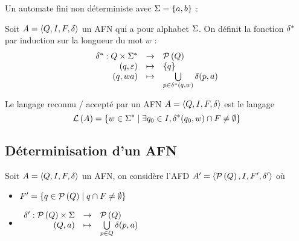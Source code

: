 \begin{exemple}
	Un automate fini non déterministe avec $\Sigma = \left\{a, b\right\}$ :
	\begin{center}
	\end{center}
\end{exemple}


\begin{definition}
	Soit $A = \langle Q, I, F, \delta \rangle$ un AFN qui a pour alphabet $\Sigma$. On définit la fonction $\delta^{*}$ par induction sur la longueur du mot $w$ :
	$$ \begin{array}{rcl}
			\delta^{*} : Q \times \Sigma^{*} & \to     & \mathcal{P}\left(Q\right)                                                  \\
			(q, \varepsilon)                   & \mapsto & \left\{q\right\}                                                    \\
			(q, wa)                         & \mapsto & \bigcup\limits_{p \in \delta^{*} (q, w)} \delta(p, a)
		\end{array} $$
\end{definition}


\begin{definition}
	Le langage reconnu / accepté par un AFN $A = \langle Q, I, F, \delta \rangle$ est le langage
	$$ \mathcal{L}\left(A\right) = \left\{w \in \Sigma^{*} \mid \exists q_0 \in I, \delta^{*}(q_0, w) \cap F \neq \emptyset\right\} $$

\end{definition}

\subsection{Déterminisation d'un AFN}

Soit $A = \langle Q, I, F, \delta \rangle$ un AFN, on considère l'AFD $A' = \langle \mathcal{P}\left(Q\right), I, F', \delta' \rangle$ où
\begin{itemize}
	\item $F' = \left\{q \in \mathcal{P}\left(Q\right) \mid q \cap F \neq \emptyset\right\}$
	      \vspace{0.25cm}
	\item $ \begin{array}{rcl}
			      \delta' : \mathcal{P}\left(Q\right) \times \Sigma & \to     & \mathcal{P}\left(Q\right)                              \\
			      (Q, a)                              & \mapsto & \bigcup\limits_{p \in Q} \delta(p, a)
		      \end{array} $
\end{itemize}

